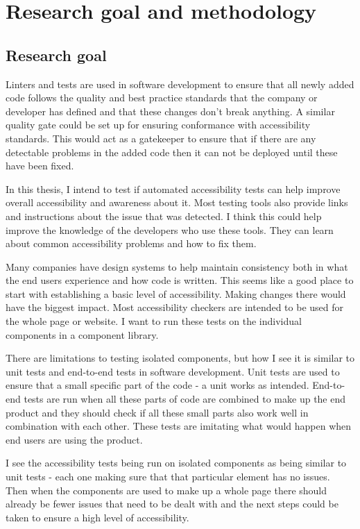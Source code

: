 \documentclass{master_thesis}
\begin{document}
\section{Research goal and methodology}
\subsection{Research goal}

Linters and tests are used in software development to ensure that all newly added code follows the quality and best practice standards that the company or developer has defined and that these changes don't break anything. A similar quality gate could be set up for ensuring conformance with accessibility standards. This would act as a gatekeeper to ensure that if there are any detectable problems in the added code then it can not be deployed until these have been fixed.

In this thesis, I intend to test if automated accessibility tests can help improve overall accessibility and awareness about it. Most testing tools also provide links and instructions about the issue that was detected. I think this could help improve the knowledge of the developers who use these tools. They can learn about common accessibility problems and how to fix them.

Many companies have design systems to help maintain consistency both in what the end users experience and how code is written. This seems like a good place to start with establishing a basic level of accessibility. Making changes there would have the biggest impact. Most accessibility checkers are intended to be used for the whole page or website. I want to run these tests on the individual components in a component library.

There are limitations to testing isolated components, but how I see it is similar to unit tests and end-to-end tests in software development. Unit tests are used to ensure that a small specific part of the code - a unit works as intended. End-to-end tests are run when all these parts of code are combined to make up the end product and they should check if all these small parts also work well in combination with each other. These tests are imitating what would happen when end users are using the product.

I see the accessibility tests being run on isolated components as being similar to unit tests - each one making sure that that particular element has no issues. Then when the components are used to make up a whole page there should already be fewer issues that need to be dealt with and the next steps could be taken to ensure a high level of accessibility.
\end{document}
